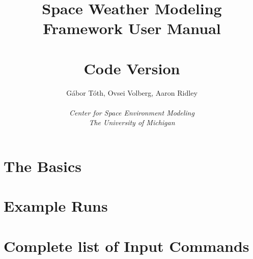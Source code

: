 \documentclass[twoside,10pt]{book}
\title{Space Weather Modeling Framework User Manual \\ 
       \hfill \\
       \large Code Version \SWMFVERSION}
\author{G\'abor T\'oth, Ovsei Volberg, Aaron Ridley\\
       \hfill \\
       {\it Center for Space Environment Modeling}\\
       {\it The University of Michigan}}
\begin{document}
\pagestyle{fancy}
\lhead[\fancyplain{}{\bfseries\thepage}]{\fancyplain{}{\bfseries\rightmark}}
\rhead[\fancyplain{}{\bfseries\leftmark}]{\fancyplain{}{\bfseries\thepage}}
\cfoot{}

\maketitle

\tableofcontents



\chapter{The Basics}





\chapter{Example Runs}


\chapter{Complete list of Input Commands}








\end{document}
